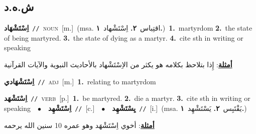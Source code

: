 \documentclass[10pt,a4paper,twoside]{article} %
\begin{document}
\begin{multicols}{2}
\vspace{-3mm}
\subsection*{\color{blue}\foreignlanguage{arabic}{ش.ه.د}\color{blue}{}} 

{\setlength\topsep{0pt}\textbf{\foreignlanguage{arabic}{اِسْتَشْهَاد}}\ {\color{gray}\texttt{//}\color{black}}\ \textsc{noun}\ [m.]\ \color{gray}(msa. \foreignlanguage{arabic}{اقتِباس}~\foreignlanguage{arabic}{\textbf{٢.}}  \foreignlanguage{arabic}{اِسْتَشْهاد}~\foreignlanguage{arabic}{\textbf{١.}})\color{black}\ \textbf{1.}~martyrdom  \textbf{2.}~the state of being martyred.  \textbf{3.}~the state of dying as a martyr.  \textbf{4.}~cite sth in writing or speaking\  \begin{flushright}\color{gray}\foreignlanguage{arabic}{\textbf{\underline{\foreignlanguage{arabic}{أمثلة}}}: إِذا بتلاحظ بكلامه هو يكثر من الاِسْتَشْهاد بالأحاديث النبوية والآيات القرآنية}\end{flushright}\color{black}} \vspace{2mm}

{\setlength\topsep{0pt}\textbf{\foreignlanguage{arabic}{اِسْتَشْهَادي}}\ {\color{gray}\texttt{//}\color{black}}\ \textsc{adj}\ [m.]\ \textbf{1.}~relating to martyrdom\ } \vspace{2mm}

{\setlength\topsep{0pt}\textbf{\foreignlanguage{arabic}{اِسْتَشْهَد}}\ {\color{gray}\texttt{//}\color{black}}\ \textsc{verb}\ [p.]\ \textbf{1.}~be martyred.  \textbf{2.}~die a martyr.  \textbf{3.}~cite sth in writing or speaking\ \ $\bullet$\ \ \setlength\topsep{0pt}\textbf{\foreignlanguage{arabic}{اِسْتَشْهِد}}\ {\color{gray}\texttt{//}\color{black}}\ [c.]\ \ $\bullet$\ \ \setlength\topsep{0pt}\textbf{\foreignlanguage{arabic}{يِسْتَشْهِد}}\ {\color{gray}\texttt{//}\color{black}}\ [i.]\ \color{gray}(msa. \foreignlanguage{arabic}{يَقْتَبِس}~\foreignlanguage{arabic}{\textbf{٢.}}  \foreignlanguage{arabic}{يَسْتَشْهِد}~\foreignlanguage{arabic}{\textbf{١.}})\color{black}\  \begin{flushright}\color{gray}\foreignlanguage{arabic}{\textbf{\underline{\foreignlanguage{arabic}{أمثلة}}}: أخوي اِسْتَشْهَد وهو عمره 10 سنين الله يرحمه}\end{flushright}\color{black}} \vspace{2mm}


\end{multicols}
\end{document}
